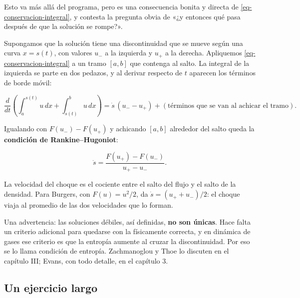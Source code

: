 \documentclass[
  spanish,
  a4paper,
]{scrbook}
\theoremstyle{definition}
\theoremstyle{plain}
\theoremstyle{definition}
\theoremstyle{plain}
\theoremstyle{definition}
\theoremstyle{remark}
\begin{document}
\begin{tcolorbox}[enhanced jigsaw, arc=.35mm, bottomrule=.15mm, bottomtitle=1mm, breakable, colback=white, colbacktitle=quarto-callout-tip-color!10!white, colframe=quarto-callout-tip-color-frame, coltitle=black, left=2mm, leftrule=.75mm, opacityback=0, opacitybacktitle=0.6, rightrule=.15mm, title=\textcolor{quarto-callout-tip-color}{\faLightbulb}\hspace{0.5em}{Para el que quiera seguir: a qué velocidad viaja un choque}, titlerule=0mm, toprule=.15mm, toptitle=1mm]

Esto va más allá del programa, pero es una consecuencia bonita y directa
de \ref{eq-conservacion-integral}, y contesta la pregunta obvia de «¿y
entonces qué pasa después de que la solución se rompe?».

Supongamos que la solución tiene una discontinuidad que se mueve según
una curva \(x = s(t)\), con valores \(u_-\) a la izquierda y \(u_+\) a
la derecha. Apliquemos \ref{eq-conservacion-integral} a un tramo
\([a,b]\) que contenga al salto. La integral de la izquierda se parte en
dos pedazos, y al derivar respecto de \(t\) aparecen los términos de
borde móvil:

\[
\frac{d}{dt}\left(\int_a^{s(t)} u\,dx + \int_{s(t)}^b u\,dx\right)
= \dot s\,(u_- - u_+) + (\text{términos que se van al achicar el tramo}) .
\]

Igualando con \(F(u_-)-F(u_+)\) y achicando \([a,b]\) alrededor del
salto queda la \textbf{condición de Rankine--Hugoniot}:

\[
\dot s = \frac{F(u_+) - F(u_-)}{u_+ - u_-} .
\]

La velocidad del choque es el cociente entre el salto del flujo y el
salto de la densidad. Para Burgers, con \(F(u)=u^2/2\), da
\(\dot s = (u_+ + u_-)/2\): el choque viaja al promedio de las dos
velocidades que lo forman.

Una advertencia: las soluciones débiles, así definidas, \textbf{no son
únicas}. Hace falta un criterio adicional para quedarse con la
físicamente correcta, y en dinámica de gases ese criterio es que la
entropía aumente al cruzar la discontinuidad. Por eso se lo llama
condición de entropía. Zachmanoglou y Thoe lo discuten en el capítulo
III; Evans, con todo detalle, en el capítulo 3.

\end{tcolorbox}

\subsection*{Un ejercicio largo}\label{un-ejercicio-largo}
\end{document}

